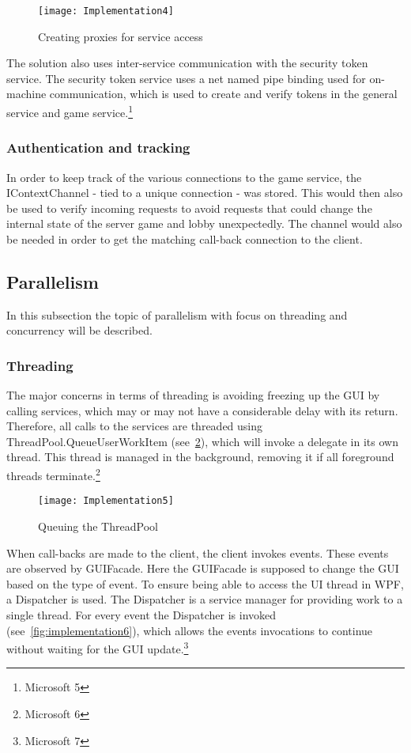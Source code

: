\begin{figure}[h]
\centerline{\texttt{[image: Implementation4]}}
\caption {Creating proxies for service access}
\label {fig:implementation4}
\end{figure}

The solution also uses inter-service communication with the security
 token service. The security token service uses a net named pipe binding
  used for on-machine communication, which is used to create and verify
  tokens in the general service and game service.\footnote{Microsoft 5}

\subsubsection {Authentication and tracking}
In order to keep track of the various connections to the game service,
 the IContextChannel - tied to a unique connection - was stored. This
 would then also be used to verify incoming requests to avoid requests
 that could change the internal state of the server game and lobby
  unexpectedly. The channel would also be needed in order to get the
   matching call-back connection to the client.

\subsection {Parallelism}
In this subsection the topic of parallelism with focus on threading and
concurrency will be described.

\subsubsection {Threading}
The major concerns in terms of threading is avoiding freezing up the GUI
by calling services, which may or may not have a considerable delay with
 its return. Therefore, all calls to the services are threaded using
 ThreadPool.QueueUserWorkItem (see~\ref{fig:implementation5}), which
 will invoke a delegate in its own thread. This thread is managed in
 the background, removing it if all foreground threads
  terminate.\footnote{Microsoft 6}

\begin{figure}[h]
\centerline{\texttt{[image: Implementation5]}}
\caption {Queuing the ThreadPool}
\label {fig:implementation5}
\end{figure}

When call-backs are made to the client, the client invokes events.
 These events are observed by GUIFacade. Here the GUIFacade is
  supposed to change the GUI based on the type of event. To ensure
   being able to access the UI thread in WPF, a Dispatcher is used.
    The Dispatcher is a service manager for providing work to a single
     thread. For every event the Dispatcher is invoked
     (see~\ref{fig:implementation6}), which allows the events invocations
      to continue without waiting for the GUI update.\footnote{Microsoft 7}

